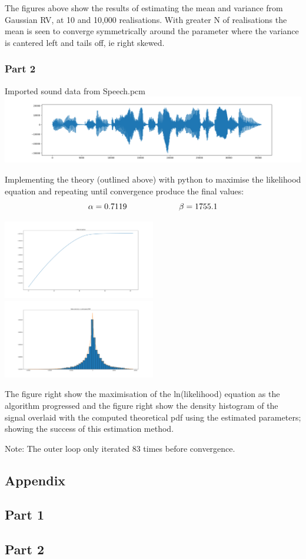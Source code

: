 \documentclass[11pt]{article}
\newcommand{\Newpage}{\end{preview}\begin{preview}}
\begin{document}
\begin{preview}
The figures above show the results of estimating the mean and variance from Gaussian RV, at 10 and 10,000 realisations. With greater N of realisations the mean is seen to converge symmetrically around the parameter where the variance is cantered left and tails off, ie right skewed.

\subsubsection*{Part 2}
\begin{center}
        Imported sound data from Speech.pcm
        \includegraphics[width = \textwidth]{inc/data.png} 
\end{center}

Implementing the theory (outlined above) with python to maximise the likelihood equation and repeating until convergence produce the final values:
$$\alpha = 0.7119 \hspace*{64pt} \beta = 1755.1$$

\includegraphics[width = 0.5\textwidth]{inc/L-maxed.png}
\includegraphics[width = 0.5\textwidth]{inc/densityVpdf.png} 

The figure right show the maximisation of the ln(likelihood) equation as the algorithm progressed and the figure right show the density histogram of the signal overlaid with the computed theoretical pdf using the estimated parameters; showing the success of this estimation method.

Note: The outer loop only iterated 83 times before convergence.

\Newpage
\section*{Appendix}
\subsection*{Part 1}
\subsection*{Part 2}

\end{preview}
\end{document}
